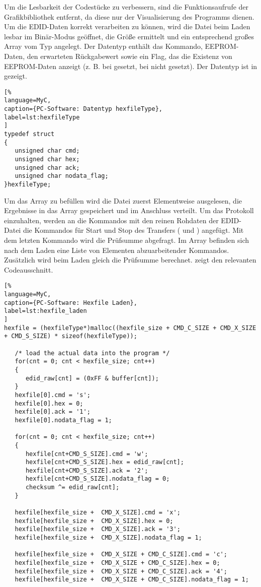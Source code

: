 Um die Lesbarkeit der Codestücke zu verbessern, sind die Funktionsaufrufe der Grafikbibliothek  entfernt, da diese nur der Visualisierung des Programms dienen.\\
Um die EDID-Daten korrekt verarbeiten zu können, wird die Datei beim Laden lesbar im Binär-Modus geöffnet, die Größe ermittelt und ein entsprechend großes Array  vom Typ  angelegt. Der Datentyp enthält das Kommando, EEPROM-Daten, den erwarteten Rückgabewert sowie ein Flag, das die Existenz von EEPROM-Daten anzeigt (z. B. bei  gesetzt, bei  nicht gesetzt). Der Datentyp  ist in  gezeigt.
\begin{lstlisting}[%
language=MyC,
caption={PC-Software: Datentyp hexfileType},
label=lst:hexfileType
]
typedef struct
{
   unsigned char cmd;
   unsigned char hex;
   unsigned char ack;
   unsigned char nodata_flag;
}hexfileType;
\end{lstlisting}%
Um das Array  zu befüllen wird die Datei zuerst Elementweise ausgelesen, die Ergebnisse in das Array  gespeichert und im Anschluss verteilt. Um das Protokoll einzuhalten, werden an die Kommandos mit den reinen Rohdaten der EDID-Datei die Kommandos für Start und Stop des Transfers ( und ) angefügt. Mit dem letzten Kommando wird die Prüfsumme abgefragt. Im Array  befinden sich nach dem Laden eine Liste von Elementen abzuarbeitender Kommandos. Zusätzlich wird beim Laden gleich die Prüfsumme berechnet.  zeigt den relevanten Codeausschnitt. 
\begin{lstlisting}[%
language=MyC,
caption={PC-Software: Hexfile Laden},
label=lst:hexfile_laden
]
hexfile = (hexfileType*)malloc((hexfile_size + CMD_C_SIZE + CMD_X_SIZE + CMD_S_SIZE) * sizeof(hexfileType));

   /* load the actual data into the program */
   for(cnt = 0; cnt < hexfile_size; cnt++)
   {
      edid_raw[cnt] = (0xFF & buffer[cnt]);
   }
   hexfile[0].cmd = 's';
   hexfile[0].hex = 0;
   hexfile[0].ack = '1';
   hexfile[0].nodata_flag = 1;

   for(cnt = 0; cnt < hexfile_size; cnt++)
   {
      hexfile[cnt+CMD_S_SIZE].cmd = 'w';
      hexfile[cnt+CMD_S_SIZE].hex = edid_raw[cnt];
      hexfile[cnt+CMD_S_SIZE].ack = '2';
      hexfile[cnt+CMD_S_SIZE].nodata_flag = 0;
      checksum ^= edid_raw[cnt];
   }

   hexfile[hexfile_size +  CMD_X_SIZE].cmd = 'x';
   hexfile[hexfile_size +  CMD_X_SIZE].hex = 0;
   hexfile[hexfile_size +  CMD_X_SIZE].ack = '3';
   hexfile[hexfile_size +  CMD_X_SIZE].nodata_flag = 1;

   hexfile[hexfile_size +  CMD_X_SIZE + CMD_C_SIZE].cmd = 'c';
   hexfile[hexfile_size +  CMD_X_SIZE + CMD_C_SIZE].hex = 0;
   hexfile[hexfile_size +  CMD_X_SIZE + CMD_C_SIZE].ack = '4';
   hexfile[hexfile_size +  CMD_X_SIZE + CMD_C_SIZE].nodata_flag = 1;
\end{lstlisting}%
